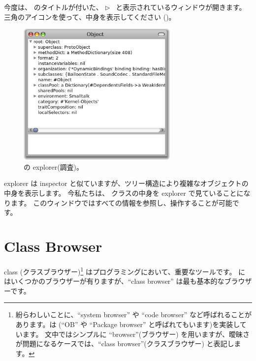 \documentclass[a4paper,10pt,twoside]{book}
\begin{document}


今度は、 のタイトルが付いた、
\mbox{$\triangleright$ } と表示されているウィンドウが開きます。
三角のアイコンを使って、中身を表示してください ()。

\begin{figure}[htb]
\centerline {\includegraphics[width=0.7\textwidth]{ExploreIt}}
\caption{ の explorer(調査)。}
\end{figure}

explorer は inspector と似ていますが、ツリー構造により複雑なオブジェクトの中身を表示します。
今私たちは、 クラスの中身を explorer で見ていることになります。
このウィンドウではすべての情報を参照し、操作することが可能です。

\section{Class Browser}

class (クラスブラウザー)\footnote{紛らわしいことに、``system browser'' や ``code browser'' など呼ばれることがあります。\pharo は  (``OB'' や ``Package browser'' と呼ばれてもいます)を実装しています。
文中ではシンプルに ``browser''(ブラウザー) を用いますが、曖昧さが問題になるケースでは、``class browser''(クラスブラウザー) と表記します。} はプログラミングにおいて、重要なツールです。
\pharo にはいくつかのブラウザーが有りますが、``class browser'' は最も基本的なブラウザーです。
\end{document}
